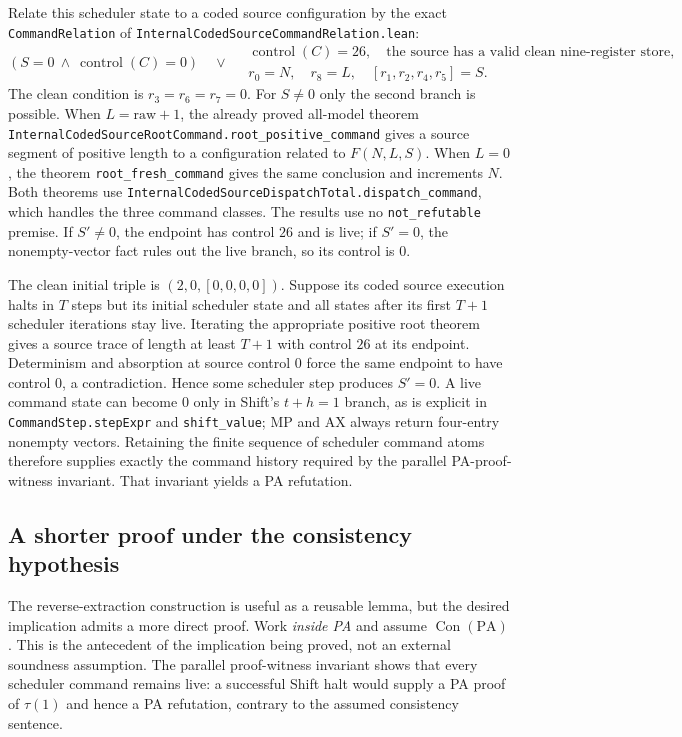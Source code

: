 \documentclass[11pt]{article}
\newcommand{\PA}{\mathrm{PA}}
\newcommand{\Con}{\operatorname{Con}}
\newcommand{\tr}{\tau}
\begin{document}
Relate this scheduler state to a coded source configuration by the
exact \texttt{CommandRelation} of
\texttt{InternalCodedSourceCommandRelation.lean}:
\[
 (S=0\ \wedge\ \operatorname{control}(C)=0)\quad\vee\quad
 \begin{gathered}
 \operatorname{control}(C)=26,\quad
 \text{the source has a valid clean nine-register store},\\
 r_0=N,\quad r_8=L,\quad
 [r_1,r_2,r_4,r_5]=S.
 \end{gathered}
\]
The clean condition is $r_3=r_6=r_7=0$.  For $S\ne0$ only the
second branch is possible.  When $L=\mathrm{raw}+1$, the already
proved all-model theorem
\nolinkurl{InternalCodedSourceRootCommand.root_positive_command}
gives a source segment of positive length to a configuration related
to $F(N,L,S)$.  When $L=0$, the theorem
\texttt{root\_fresh\_command} gives the same conclusion and increments
$N$.  Both theorems use
\nolinkurl{InternalCodedSourceDispatchTotal.dispatch_command}, which
handles the three command classes.  The results use no
\texttt{not\_refutable} premise.  If $S'\ne0$, the endpoint has
control $26$ and is live; if $S'=0$, the nonempty-vector fact rules
out the live branch, so its control is $0$.

The clean initial triple is
$(2,0,[0,0,0,0])$.  Suppose its coded source execution halts in $T$
steps but its initial scheduler state and all states after its first
$T+1$ scheduler iterations stay live.  Iterating
the appropriate positive root theorem gives a source trace of length
at least $T+1$ with control $26$ at its endpoint.  Determinism and
absorption at source control $0$ force the same endpoint to have
control $0$, a contradiction.  Hence some scheduler step produces
$S'=0$.  A live command state can become $0$ only in Shift's
$t+h=1$ branch, as is explicit in \texttt{CommandStep.stepExpr} and
\texttt{shift\_value}; MP and AX always return four-entry nonempty
vectors.  Retaining the finite sequence of scheduler command atoms
therefore supplies exactly the command history required by the
parallel PA-proof-witness invariant.  That invariant yields a PA
refutation.

\subsection{A shorter proof under the consistency hypothesis}

The reverse-extraction construction is useful as a reusable lemma,
but the desired implication admits a more direct proof.  Work
\emph{inside PA} and assume $\Con(\PA)$.  This is the antecedent of
the implication being proved, not an external soundness assumption.
The parallel proof-witness invariant shows that every scheduler
command remains live: a successful Shift halt would supply a PA
proof of $\tr(1)$ and hence a PA refutation, contrary to the assumed
consistency sentence.
\end{document}
